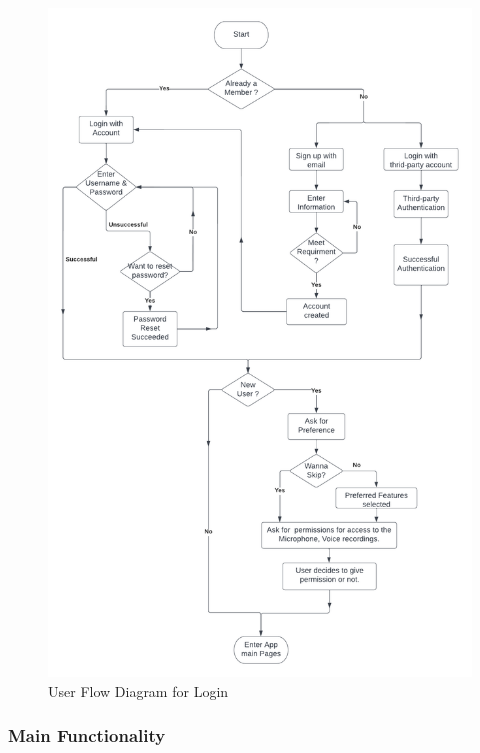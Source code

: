 \begin{figure}
\centering
\includegraphics[scale = 0.25]{Figures/Flow diagram1.png}
\caption{User Flow Diagram for Login}
\centering
\end{figure}

\subsubsection*{Main Functionality}

